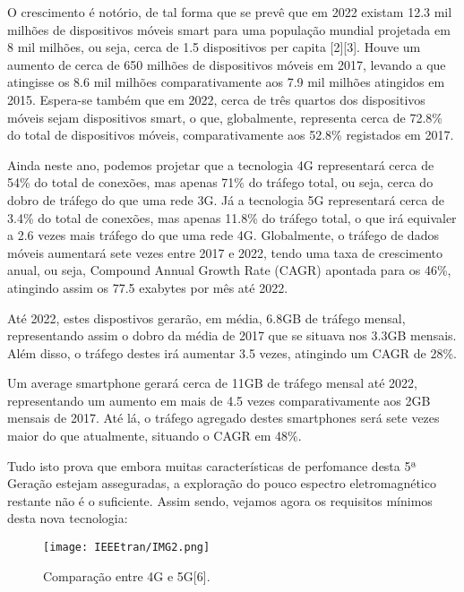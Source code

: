 \documentclass[conference]{IEEEtran}
\begin{document}
O crescimento é notório, de tal forma que se prevê que em 2022 existam 12.3 mil milhões de dispositivos móveis smart para uma população mundial projetada em 8 mil milhões, ou seja, cerca de 1.5 dispositivos per capita [2][3]. Houve um aumento de cerca de 650 milhões de dispositivos móveis em 2017, levando a que atingisse os 8.6 mil milhões comparativamente aos 7.9 mil milhões atingidos em 2015. Espera-se também que em 2022, cerca de três quartos dos dispositivos móveis sejam dispositivos smart, o que, globalmente, representa cerca de 72.8\% do total de dispositivos móveis, comparativamente aos 52.8\% registados em 2017. \par
Ainda neste ano, podemos projetar que a tecnologia 4G representará cerca de 54\% do total de conexões, mas apenas 71\% do tráfego total, ou seja, cerca do dobro de tráfego do que uma rede 3G. Já a tecnologia 5G representará cerca de 3.4\% do total de conexões, mas apenas 11.8\% do tráfego total, o que irá equivaler a 2.6 vezes mais tráfego do que uma rede 4G. Globalmente, o tráfego de dados móveis aumentará sete vezes entre 2017 e 2022, tendo uma taxa de crescimento anual, ou seja, Compound Annual Growth Rate (CAGR) apontada para os 46\%, atingindo assim os 77.5 exabytes por mês até 2022. \par
Até 2022, estes dispostivos gerarão, em média, 6.8GB de tráfego mensal, representando assim o dobro da média de 2017 que se situava nos 3.3GB mensais. Além disso, o tráfego destes irá aumentar 3.5 vezes, atingindo um CAGR de 28\%. \par
Um average smartphone gerará cerca de 11GB de tráfego mensal até 2022, representando um aumento em mais de 4.5 vezes comparativamente aos 2GB mensais de 2017. Até lá, o tráfego agregado destes smartphones será sete vezes maior do que atualmente, situando o CAGR em 48\%. \par
Tudo isto prova que embora muitas características de perfomance desta 5ª Geração estejam asseguradas, a exploração do pouco espectro eletromagnético restante não é o suficiente.
Assim sendo, vejamos agora os requisitos mínimos desta nova tecnologia:

\begin{figure}
\centering
\texttt{[image: IEEEtran/IMG2.png]}
\caption{Comparação entre 4G e 5G[6].}
\end{figure}
\end{document}
